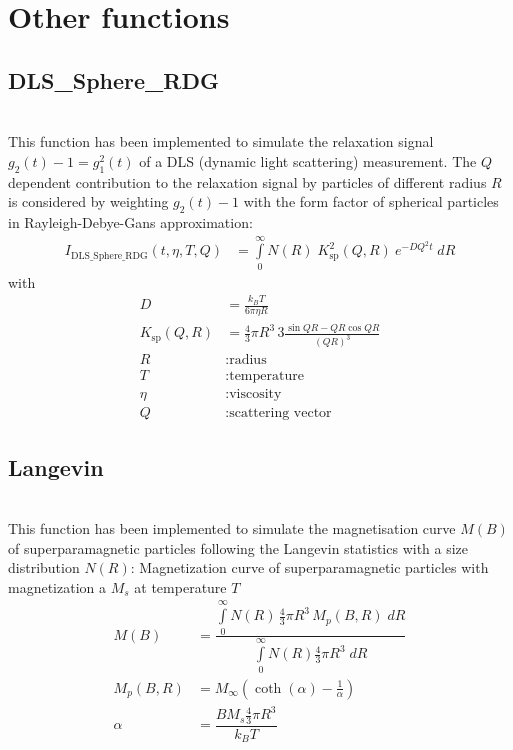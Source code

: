 \section{Other functions}

\subsection{DLS\_Sphere\_RDG}  ~\\

This function has been implemented to simulate the relaxation
signal $g_2(t)-1 = g_1^2(t)$ of a DLS (dynamic light scattering)
measurement. The $Q$ dependent contribution to the relaxation
signal by particles of different radius $R$ is considered by
weighting $g_2(t)-1$ with the form factor of spherical particles in
Rayleigh-Debye-Gans approximation:
\begin{align}
   I_\text{DLS\_Sphere\_RDG} (t,\eta,T,Q) &=  \int\limits_0^\infty N(R) \; K^2_\text{sp}(Q,R)
   \: e^{-D Q^2t} \; dR
\end{align}
with
\begin{align}
   D        & = \frac{k_BT}{6\pi\eta R} \nonumber \\
   K_\text{sp}(Q,R) & = \frac{4}{3}\pi R^3  \, 3 \frac{\sin QR - QR \cos
   QR}{(QR)^3}\nonumber\\
   R & : \text {radius} \nonumber \\
   T & : \text {temperature} \nonumber \\
   \eta & : \text {viscosity} \nonumber \\
   Q & : \text {scattering vector} \nonumber
\end{align}


\clearpage
\subsection{Langevin}  ~\\

This function has been implemented to simulate the magnetisation
curve $M(B)$ of superparamagnetic particles following the Langevin
statistics with a size distribution $N(R)$: Magnetization curve of
superparamagnetic particles with magnetization a $M_s$ at
temperature $T$
\begin{align}
M(B) & = \dfrac{\int\limits_0^\infty N(R)\, \tfrac{4}{3}\pi R^3\,
M_{p}(B,R) \; dR}{\int\limits_0^\infty N(R) \tfrac{4}{3}\pi
R^3\;dR}
\\[3mm]
M_{p}(B,R)  & = M_\infty\left(\coth(\alpha) - \tfrac{1}{\alpha}\right)  \nonumber \\
\alpha       & = \dfrac{B M_s \tfrac{4}{3}\pi R^3}{k_B T}
\nonumber
\end{align}


